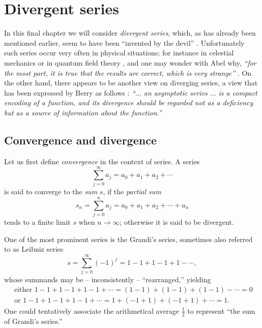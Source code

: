 \chapter{Divergent series}
\label{2011-m-ch-ds}
In this final chapter we will consider {\em divergent series}, which,
as has already been mentioned earlier,
seem to have been ``invented by the devil'' \cite{Hardy:1949}.
Unfortunately such series occur
very often in physical situations;
for instance in celestial mechanics or in quantum field theory
\cite{Boyd99thedevil,PhysRev.85.631,PhysRevD.57.1144,PhysRevD.62.076001},
and one may wonder with Abel why, {\em ``for the most part,
it is true that the results are correct, which is very strange''  }
\cite{rousseau-2004}.
On the other hand,
there appears to be another view on diverging series,
a view that has been expressed by Berry as follows
\cite{berry-92}:
{\em ``$\ldots$ an asymptotic series $\ldots$ is a compact encoding of a function,
and its divergence should be regarded not as a deficiency but as a source of information about the function.''
}

\section{Convergence and divergence}
Let us first define {\em convergence} in the context of series.
A series
\begin{equation}
\sum_{j=0}^\infty a_j =a_0+a_1+a_2+\cdots
\end{equation}
is said to converge to the {\em sum}
$s$, if the {\em partial sum}
\begin{equation}
s_n=  \sum_{j=0}^n a_j =a_0+a_1+a_2+\cdots + a_n
\end{equation}
tends to a finite limit $s$ when $n\rightarrow \infty$;
otherwise it is said to be divergent.

One of the most prominent series is the Grandi's series, sometimes also referred to as
Leibniz series~\cite{leibnitz-1860,moore-1938,Hardy:1949,everest-2003}
\begin{equation}
s = \sum_{j=0}^\infty (-1)^j=1-1+1-1+1-\cdots ,
\label{2009-fiftyfifty-1s}
\end{equation}
whose summands may be -- inconsistently
-- ``rearranged,''
yielding
\begin{equation*}
\begin{split}
\textrm{ either }
1-1+1-1+1-1+\cdots = (1-1)+(1-1)+(1-1)-\cdots =0\\
\textrm{ or }
1-1+1-1+1-1+\cdots = 1+(-1+1)+ (-1+1) +\cdots =1.
\end{split}
\end{equation*}
One could tentatively associate the arithmetical average $\frac{1}{2}$ to represent ``the sum of Grandi's series.''


